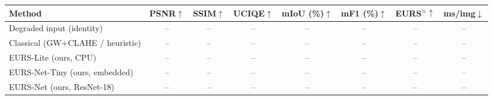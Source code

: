 \begin{tabular}{lccccccc}
\toprule
Method & PSNR$\uparrow$ & SSIM$\uparrow$ & UCIQE$\uparrow$ & mIoU (\%)$\uparrow$ & mF1 (\%)$\uparrow$ & EURS$^{\approx}\uparrow$ & ms/img$\downarrow$ \\
\midrule
Degraded input (identity) & -- & -- & -- & -- & -- & -- & -- \\
Classical (GW+CLAHE / heuristic) & -- & -- & -- & -- & -- & -- & -- \\
EURS-Lite (ours, CPU) & -- & -- & -- & -- & -- & -- & -- \\
EURS-Net-Tiny (ours, embedded) & -- & -- & -- & -- & -- & -- & -- \\
EURS-Net (ours, ResNet-18) & -- & -- & -- & -- & -- & -- & -- \\
\bottomrule
\end{tabular}
